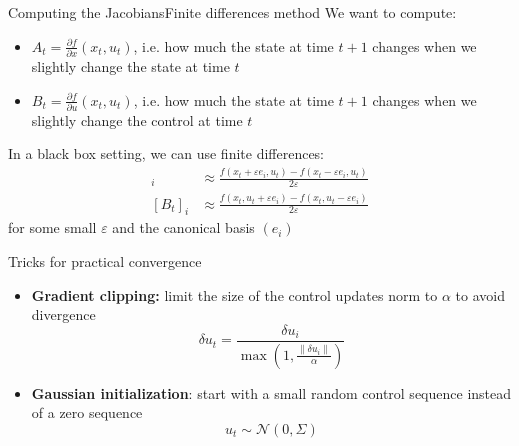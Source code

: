 \documentclass[aspectratio=169]{beamer}
\theoremstyle{definition}
\begin{document}
\begin{frame}{Computing the Jacobians}{Finite differences method}
    We want to compute:
    \begin{itemize}
        \item $A_t=\frac{\partial f}{\partial x}(x_t, u_t)$, i.e. how much the state at time $t+1$ changes when we slightly change the state at time $t$
        \item $B_t=\frac{\partial f}{\partial u}(x_t, u_t)$, i.e. how much the state at time $t+1$ changes when we slightly change the control at time $t$
    \end{itemize}
    In a black box setting, we can use finite differences:
    \begin{align*}
        [A_t]_i &\approx \frac{f(x_t+\varepsilon e_i, u_t)-f(x_t-\varepsilon e_i, u_t)}{2\varepsilon}\\
        [B_t]_i &\approx \frac{f(x_t, u_t+\varepsilon e_i)-f(x_t, u_t-\varepsilon e_i)}{2\varepsilon}
    \end{align*}
    for some small $\varepsilon$ and the canonical basis $(e_i)$
\end{frame}

    

\begin{frame}{Tricks for practical convergence}
    \begin{itemize}
        \item \textbf{Gradient clipping:} limit the size of the control updates norm to $\alpha$ to avoid divergence
        \begin{equation*}
            \delta u_t = \frac{\delta u_i}{\max\left(1, \frac{\|\delta u_i\|}{\alpha}\right)}
        \end{equation*}
        \item \textbf{Gaussian initialization}: start with a small random control sequence instead of a zero sequence
        \begin{equation*}
            u_t \sim \mathcal{N}(0, \Sigma)
        \end{equation*}
    \end{itemize}
\end{frame}
\end{document}
